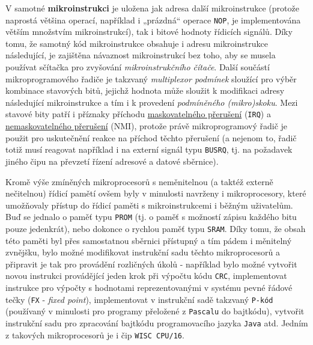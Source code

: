       V samotné \textbf{mikroinstrukci} je uložena jak adresa další mikroinstrukce (protože 
      naprostá většina operací, například i „prázdná“ operace \texttt{NOP}, je implementována 
      větším množstvím mikroinstrukcí), tak i bitové hodnoty řídicích signálů. Díky tomu, že 
      samotný kód mikroinstrukce obsahuje i adresu mikroinstrukce následující, je zajištěna 
      návaznost mikroinstrukcí bez toho, aby se musela používat sčítačka pro zvyšování 
      \emph{mikroinstrukčního čítače}. Další součástí mikroprogramového řadiče je takzvaný 
      \emph{multiplexor podmínek} sloužící pro výběr kombinace stavových bitů, jejichž hodnota může 
      sloužit k modifikaci adresy následující mikroinstrukce a tím i k provedení \emph{podmíněného 
      (mikro)skoku}. Mezi stavové bity patří i příznaky příchodu 
      \hyperlink{ces:IchapIVsecIV}{maskovatelného přerušení} (\texttt{IRQ}) a 
      \hyperlink{ces:IchapIVsecIV}{nemaskovatelného přerušení} (NMI), protože právě mikroprogramový 
      řadič je použit pro uskutečnění reakce na příchod těchto přerušení (a nejenom to, řadič totiž 
      musí reagovat například i na externí signál typu \texttt{BUSRQ}, tj. na požadavek jiného čipu 
      na převzetí řízení adresové a datové sběrnice). 
      
      \begin{mdframed}[style=mdnote]
        Kromě výše zmíněných mikroprocesorů s neměnitelnou (a taktéž externě nečitelnou) řídicí 
        pamětí ovšem byly v minulosti navrženy i mikroprocesory, které umožňovaly přístup do řídicí 
        paměti s mikroinstrukcemi i běžným uživatelům. Buď se jednalo o paměť typu \texttt{PROM} 
        (tj. o paměť s možností zápisu každého bitu pouze jedenkrát), nebo dokonce o rychlou paměť 
        typu \texttt{SRAM}. Díky tomu, že obsah této paměti byl přes samostatnou sběrnici přístupný 
        a tím pádem i měnitelný zvnějšku, bylo možné modifikovat instrukční sadu těchto 
        mikroprocesorů a připravit je tak pro provádění rozličných úkolů - například bylo možné 
        vytvořit novou instrukci provádějící jeden krok při výpočtu kódu \texttt{CRC}, 
        implementovat instrukce pro výpočty s hodnotami reprezentovanými v systému pevné řádové 
        tečky (\texttt{FX} - \emph{fixed point}), implementovat v instrukční sadě takzvaný 
        \texttt{P-kód} (používaný v minulosti pro programy přeložené z \texttt{Pascalu} do 
        bajtkódu), vytvořit instrukční sadu pro zpracování bajtkódu programovacího jazyka 
        \texttt{Java} atd. Jedním z takových mikroprocesorů je i čip \texttt{WISC CPU/16}.
      \end{mdframed}
           
